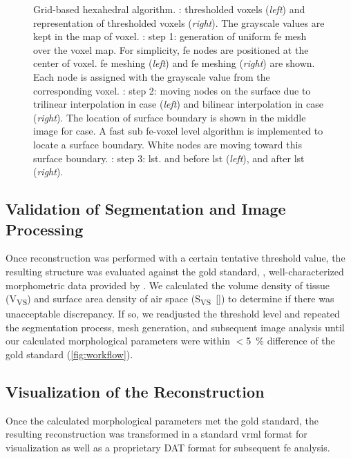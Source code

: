 \begin{figure}
{		\label{subfig:tsuda-04d}%
	}%
	\caption[Grid-based hexahedral algorithm]{Grid-based hexahedral algorithm. : \threed thresholded voxels (\textit{left}) and \twod representation of thresholded voxels (\textit{right}). The grayscale values are kept in the map of voxel. : step 1: generation of uniform \acl{fe} mesh over the voxel map. For simplicity, \ac{fe} nodes are positioned at the center of voxel. \threed \ac{fe} meshing (\textit{left}) and \twod \ac{fe} meshing (\textit{right}) are shown. Each node is assigned with the grayscale value from the corresponding voxel. : step 2: moving nodes on the surface due to trilinear interpolation in \threed case (\textit{left}) and bilinear interpolation in \twod case (\textit{right}). The location of surface boundary is shown in the middle image for \twod case. A fast sub \ac{fe}-voxel level algorithm is implemented to locate a surface boundary. White nodes are moving toward this surface boundary. : step 3: \acf{lst}. \threed and \twod before \ac{lst} (\textit{left}), \threed and \twod after \ac{lst} (\textit{right}).}
	\label{fig:tsuda-04}
\end{figure}

\subsection[Validation of Segmentation]{Validation of Segmentation and Image Processing}
Once \threed reconstruction was performed with a certain tentative threshold value, the resulting \threed structure was evaluated against the gold standard, \ie, well-characterized morphometric data provided by \citet{Tschanz2003}. We calculated the volume density of tissue (V\textsubscript{VS}) and surface area density of air space (S\textsubscript{VS}~[\centimetresquared\per\centimetrecubed]) to determine if there was unacceptable discrepancy. If so, we readjusted the threshold level and repeated the segmentation process, mesh generation, and subsequent image analysis until our calculated morphological parameters were within $<$\SI{5}{\percent} difference of the gold standard (\autoref{fig:workflow}).

\subsection[Visualization of the Reconstruction]{Visualization of the \threed Reconstruction}
Once the calculated morphological parameters met the gold standard, the resulting \threed reconstruction was transformed in a standard \acs{vrml} format for visualization as well as a proprietary DAT format for subsequent \ac{fe} analysis.


